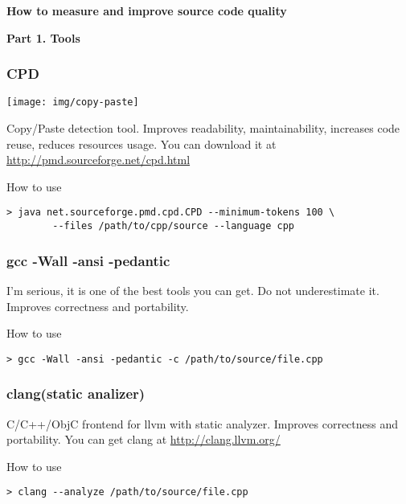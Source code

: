 \documentclass{beamer}
\begin{document}
\begin{frame}
\begin{block}{\begin{center}\Large\textbf{How to measure and improve source code quality}\end{center}}
\begin{center}
\textbf{Part 1. Tools}
\end{center}
\end{block}
\end{frame}

\begin{frame}[fragile]
\frametitle{CPD}
\begin{center}
\texttt{[image: img/copy-paste]}
\end{center}
Copy/Paste detection tool. Improves readability, maintainability, increases code reuse, reduces resources usage. You can download it at \url{http://pmd.sourceforge.net/cpd.html}
\begin{exampleblock}{How to use}
\begin{verbatim}
> java net.sourceforge.pmd.cpd.CPD --minimum-tokens 100 \
        --files /path/to/cpp/source --language cpp
\end{verbatim}
\end{exampleblock}
\end{frame}

\begin{frame}[fragile]
\frametitle{gcc -Wall -ansi -pedantic}
I'm serious, it is one of the best tools you can get. Do not underestimate it. Improves correctness and portability.
\begin{exampleblock}{How to use}
\begin{verbatim}
> gcc -Wall -ansi -pedantic -c /path/to/source/file.cpp
\end{verbatim}
\end{exampleblock}
\end{frame}

\begin{frame}[fragile]
\frametitle{clang(static analizer)}
C/C++/ObjC frontend for llvm with static analyzer. Improves correctness and portability. You can get clang at \url{http://clang.llvm.org/}
\begin{exampleblock}{How to use}
\begin{verbatim}
> clang --analyze /path/to/source/file.cpp
\end{verbatim}
\end{exampleblock}
\end{frame}
\end{document}
